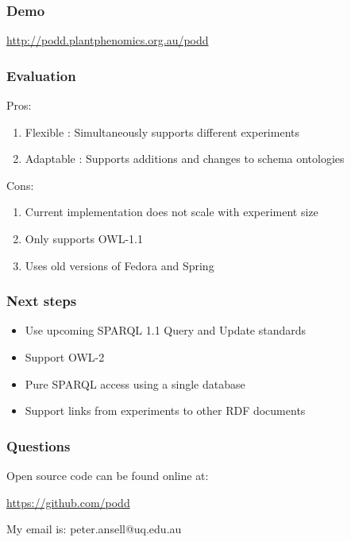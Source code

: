 \documentclass[12pt]{beamer}
\begin{document}
\bgroup
{}
\begin{frame}[plain]{}
\end{frame}
\egroup

\begin{frame}
\frametitle{Demo} 

\url{http://podd.plantphenomics.org.au/podd}

\end{frame}

\begin{frame}
\frametitle{Evaluation}

Pros:

\begin{enumerate}
 \item Flexible : Simultaneously supports different experiments
 \item Adaptable : Supports additions and changes to schema ontologies
\end{enumerate}

Cons:

\begin{enumerate}
 \item Current implementation does not scale with experiment size
 \item Only supports OWL-1.1
 \item Uses old versions of Fedora and Spring
\end{enumerate}


\end{frame}

\begin{frame}
\frametitle{Next steps}

\begin{itemize}
 \item Use upcoming SPARQL 1.1 Query and Update standards
 \item Support OWL-2
 \item Pure SPARQL access using a single database
 \item Support links from experiments to other RDF documents
\end{itemize}


\end{frame}


\begin{frame}
\frametitle{Questions}

\begin{center}
Open source code can be found online at:

\url{https://github.com/podd}

\vskip 12pt

My email is: peter.ansell@uq.edu.au
\end{center}
\end{frame}
\end{document}
